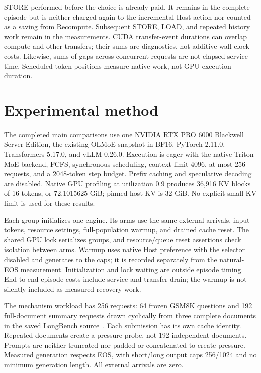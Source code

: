 \documentclass[10pt,a4paper]{article}
\begin{document}
STORE performed before the choice is already paid. It remains in the complete
episode but is neither charged again to the incremental Host action nor counted
as a saving from Recompute. Subsequent STORE, LOAD, and repeated history work
remain in the measurements. CUDA transfer-event durations can overlap compute
and other transfers; their sums are diagnostics, not additive wall-clock costs.
Likewise, sums of gaps across concurrent requests are not elapsed service time.
Scheduled token positions measure native work, not GPU execution duration.

\section{Experimental method}
The completed main comparisons use one NVIDIA RTX PRO 6000 Blackwell Server
Edition, the existing OLMoE snapshot in BF16, PyTorch 2.11.0, Transformers
5.17.0, and vLLM 0.26.0. Execution is eager with the native Triton MoE backend,
FCFS, synchronous scheduling, context limit 4096, at most 256 requests, and a
2048-token step budget. Prefix caching and speculative decoding are disabled.
Native GPU profiling at utilization 0.9 produces 36,916 KV blocks of 16 tokens,
or 72.1015625 GiB; pinned host KV is 32 GiB. No explicit small KV limit is used
for these results.

Each group initializes one engine. Its arms use the same external arrivals,
input tokens, resource settings, full-population warmup, and drained cache reset.
The shared GPU lock serializes groups, and resource/queue reset assertions
check isolation between arms. Warmup uses native Host preference with the
selector disabled and generates to the caps; it is recorded separately from
the natural-EOS measurement. Initialization and lock waiting are outside episode
timing. End-to-end episode costs include service and transfer drain; the warmup
is not silently included as measured recovery work.

The mechanism workload has 256 requests: 64 frozen GSM8K questions and 192
full-document summary requests drawn cyclically from three complete documents
in the saved LongBench source~\cite{gsm8k,longbench}. Each submission has its
own cache identity. Repeated documents create a pressure probe, not 192
independent documents. Prompts are neither truncated nor padded or concatenated
to create pressure. Measured generation respects EOS, with short/long output
caps 256/1024 and no minimum generation length. All external arrivals are zero.
\end{document}
